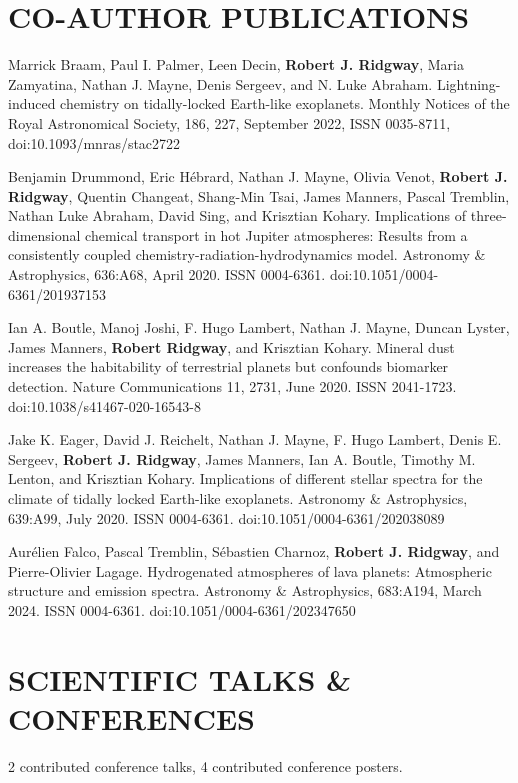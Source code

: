 \documentclass[letter, margin, 10pt]{res} %
\begin{document}
\begin{resume}
\section{CO-AUTHOR PUBLICATIONS}

Marrick Braam, Paul I. Palmer, Leen Decin, \textbf{Robert J. Ridgway}, Maria Zamyatina, Nathan J. Mayne, Denis Sergeev, and N. Luke Abraham. Lightning-induced chemistry on tidally-locked Earth-like exoplanets. Monthly Notices of the Royal Astronomical Society, 186, 227, September 2022, ISSN 0035-8711, doi:10.1093/mnras/stac2722

Benjamin Drummond, Eric H\'{e}brard, Nathan J. Mayne, Olivia Venot, \textbf{Robert J. Ridgway}, Quentin Changeat, Shang-Min Tsai, James Manners, Pascal Tremblin, Nathan Luke Abraham, David Sing, and Krisztian Kohary. Implications of three-dimensional chemical transport in hot Jupiter atmospheres: Results from a consistently coupled chemistry-radiation-hydrodynamics model. Astronomy \& Astrophysics, 636:A68, April 2020. ISSN 0004-6361. doi:10.1051/0004-6361/201937153

Ian A. Boutle, Manoj Joshi, F. Hugo Lambert, Nathan J. Mayne, Duncan Lyster, James Manners, \textbf{Robert Ridgway}, and Krisztian Kohary. Mineral dust increases the habitability of terrestrial planets but confounds biomarker detection. Nature Communications 11, 2731, June 2020. ISSN 2041-1723. doi:10.1038/s41467-020-16543-8

Jake K. Eager, David J. Reichelt, Nathan J. Mayne, F. Hugo Lambert, Denis E. Sergeev, \textbf{Robert J. Ridgway}, James Manners, Ian A. Boutle, Timothy M. Lenton, and Krisztian Kohary. Implications of different stellar spectra for the climate of tidally locked Earth-like exoplanets. Astronomy \& Astrophysics, 639:A99, July 2020. ISSN 0004-6361. doi:10.1051/0004-6361/202038089

Aur\'{e}lien Falco, Pascal Tremblin, S\'{e}bastien Charnoz, \textbf{Robert J. Ridgway}, and Pierre-Olivier Lagage. Hydrogenated atmospheres of lava planets: Atmospheric structure and emission spectra. Astronomy \& Astrophysics, 683:A194, March 2024. ISSN 0004-6361. doi:10.1051/0004-6361/202347650


\parskip \baselineskip
\vspace{-6pt}
\section{SCIENTIFIC TALKS \& CONFERENCES}
2 contributed conference talks, 4 contributed conference posters.


\end{resume}
\end{document}
